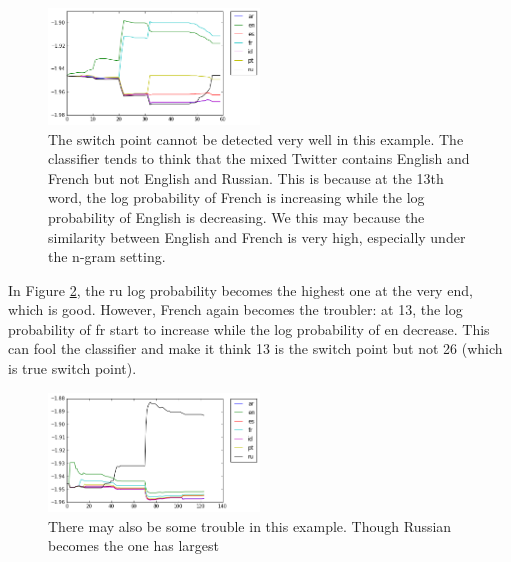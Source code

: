 \documentclass[11pt]{article}
\begin{document}
\begin{figure}
\includegraphics[width=0.5\textwidth]{multilabel_2.PNG}
\caption{The switch point cannot be detected very well in this example. The classifier tends to think that the mixed Twitter contains English and French but not English and Russian. This is because at the 13th word, the log probability of French is increasing while the log probability of English is decreasing. We this may because the similarity between English and French is very high, especially under the n-gram setting.}
\label{multilabel_2}
\end{figure}


In Figure \ref{multilabel_3}, the ru log probability becomes the highest one at the very end, which is good. However, French again becomes the troubler: at 13, the log probability of fr start to increase while the log probability of en decrease. This can fool the classifier and make it think 13 is the switch point but not 26 (which is true switch point).



\begin{figure}
\includegraphics[width=0.5\textwidth]{multilabel_3.PNG}
\caption{There may also be some trouble in this example. Though Russian becomes the one has largest }
\label{multilabel_3}
\end{figure}
\end{document}

